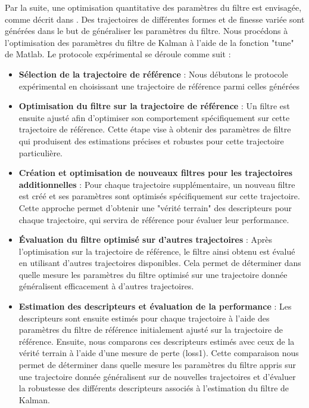 \documentclass[8pt]{article}
\begin{document}
Par la suite, une optimisation quantitative des paramètres du filtre est envisagée, comme décrit dans \cite{abbeel_discriminative_2005}. Des trajectoires de différentes formes et de finesse variée sont générées dans le but de généraliser les paramètres du filtre. Nous procédons à l'optimisation des paramètres du filtre de Kalman à l'aide de la fonction "tune" de Matlab. Le protocole expérimental se déroule comme suit : \begin{itemize}
    \item \textbf{Sélection de la trajectoire de référence} : Nous débutons le protocole expérimental en choisissant une trajectoire de référence parmi celles générées
        
    \item \textbf{Optimisation du filtre sur la trajectoire de référence} : Un filtre est ensuite ajusté afin d'optimiser son comportement spécifiquement sur cette trajectoire de référence. Cette étape vise à obtenir des paramètres de filtre qui produisent des estimations précises et robustes pour cette trajectoire particulière.
        
    \item \textbf{Création et optimisation de nouveaux filtres pour les trajectoires additionnelles} : Pour chaque trajectoire supplémentaire, un nouveau filtre est créé et ses paramètres sont optimisés spécifiquement sur cette trajectoire. Cette approche permet d'obtenir une "vérité terrain" des descripteurs pour chaque trajectoire, qui servira de référence pour évaluer leur performance.
       
    \item \textbf{Évaluation du filtre optimisé sur d'autres trajectoires} : Après l'optimisation sur la trajectoire de référence, le filtre ainsi obtenu est évalué en utilisant d'autres trajectoires disponibles. Cela permet de déterminer dans quelle mesure les paramètres du filtre optimisé sur une trajectoire donnée généralisent efficacement à d'autres trajectoires.
    
    \item \textbf{Estimation des descripteurs et évaluation de la performance} : Les descripteurs sont ensuite estimés pour chaque trajectoire à l'aide des paramètres du filtre de référence initialement ajusté sur la trajectoire de référence. Ensuite, nous comparons ces descripteurs estimés avec ceux de la vérité terrain à l'aide d'une mesure de perte (loss1). Cette comparaison nous permet de déterminer dans quelle mesure les paramètres du filtre appris sur une trajectoire donnée généralisent sur de nouvelles trajectoires et d'évaluer la robustesse des différents descripteurs associés à l'estimation du filtre de Kalman.
\end{itemize}
\end{document}
